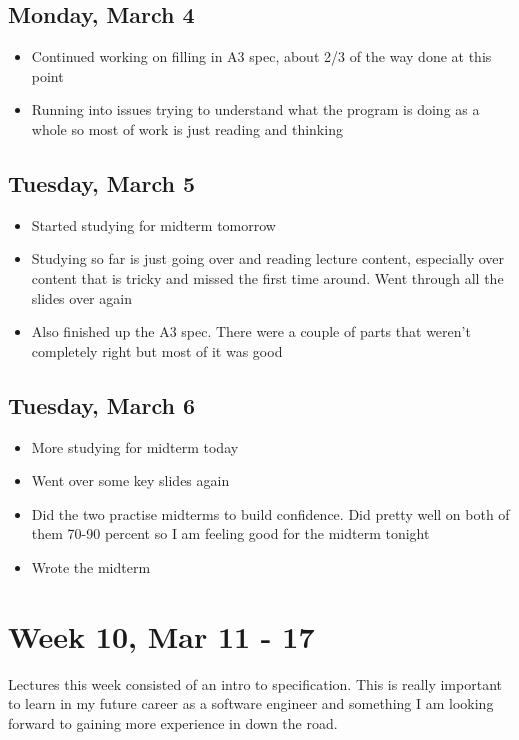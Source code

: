 \documentclass{article}
\begin{document}
\subsection{Monday, March 4}
\begin{itemize}
    \item Continued working on filling in A3 spec, about 2/3 of the way done at this point
    \item Running into issues trying to understand what the program is doing as a whole so most of work is just reading and thinking
\end{itemize}

\subsection{Tuesday, March 5}
\begin{itemize}
    \item Started studying for midterm tomorrow
    \item Studying so far is just going over and reading lecture content, especially over content that is tricky and missed the first time around. Went through all the slides over again
    \item Also finished up the A3 spec. There were a couple of parts that weren't completely right but most of it was good
\end{itemize}

\subsection{Tuesday, March 6}
\begin{itemize}
    \item More studying for midterm today
    \item Went over some key slides again
    \item Did the two practise midterms to build confidence. Did pretty well on both of them 70-90 percent so I am feeling good for the midterm tonight
    \item Wrote the midterm
\end{itemize}

\section{Week 10, Mar 11 - 17}

Lectures this week consisted of an intro to specification. This is really important to learn in my future career as a software engineer and something I am looking forward to gaining more experience in down the road.
\end{document}
